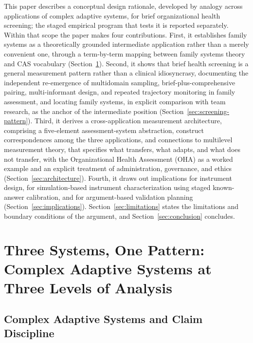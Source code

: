 \documentclass[12pt, letterpaper]{article}
\begin{document}
This paper describes a conceptual design rationale, developed by analogy across applications of complex adaptive systems, for brief organizational health screening; the staged empirical program that tests it is reported separately. Within that scope the paper makes four contributions. First, it establishes family systems as a theoretically grounded intermediate application rather than a merely convenient one, through a term-by-term mapping between family systems theory and CAS vocabulary (Section~\ref{sec:three-systems}). Second, it shows that brief health screening is a general measurement pattern rather than a clinical idiosyncrasy, documenting the independent re-emergence of multidomain sampling, brief-plus-comprehensive pairing, multi-informant design, and repeated trajectory monitoring in family assessment, and locating family systems, in explicit comparison with team research, as the anchor of the intermediate position (Section~\ref{sec:screening-pattern}). Third, it derives a cross-application measurement architecture, comprising a five-element assessment-system abstraction, construct correspondences among the three applications, and connections to multilevel measurement theory, that specifies what transfers, what adapts, and what does not transfer, with the Organizational Health Assessment (OHA) as a worked example and an explicit treatment of administration, governance, and ethics (Section~\ref{sec:architecture}). Fourth, it draws out implications for instrument design, for simulation-based instrument characterization using staged known-answer calibration, and for argument-based validation planning (Section~\ref{sec:implications}). Section~\ref{sec:limitations} states the limitations and boundary conditions of the argument, and Section~\ref{sec:conclusion} concludes.

\section{Three Systems, One Pattern: Complex Adaptive Systems at Three Levels of Analysis}
\label{sec:three-systems}

\subsection{Complex Adaptive Systems and Claim Discipline}
\label{sec:cas-discipline}
\end{document}
